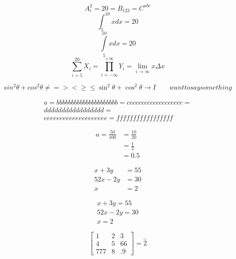 \documentclass[12pt, a4paper]{article}
\begin{document}
\begin{equation}
    A_i^2 = 20 = B_{123} = C^{abc}
\end{equation}
\newpage
\begin{equation}
    \int_{5}^{10} x dx = 20
\end{equation}
\begin{equation}
    \int\limits_{5}^{10} x dx = 20
\end{equation}
\begin{equation}
    \sum_{i=5}^{20}X_{i} = \prod_{i=-\infty}^{+\infty}Y_{i} = \lim_{i \to \infty} x \Delta x
\end{equation}

\begin{equation}
    sin^2 \theta + cos^2 \theta \neq = > < \geq \leq \sin^2 \theta + \cos^2 \theta \rightarrow I\qquad want to say something
\end{equation}

\begin{multline}
    a = bbbbbbbbbbbbbbbbbbbbb = ccccccccccccccccccc =\\ ddddddddddddddddd =\\ eeeeeeeeeeeeeeeeeeee = fffffffffffffffff
\end{multline}

\begin{equation}
    \begin{split}
        a = \frac{50}{100} &= \frac{10}{20}\\
        &= \frac{1}{2}\\
        &= 0.5
    \end{split}
\end{equation}

\begin{align}
    x + 3y &= 55\\
    52x - 2y &= 30\\
    x &= 2
\end{align}

\begin{gather}
    x + 3y = 55\\
    52x - 2y = 30\\
    x = 2
\end{gather}

\begin{equation}
    \begin{bmatrix}
        1 & 2 & 3\\
        4 & 5 & 66\\
        777 & 8 & .9
    \end{bmatrix} = \hat{2}
\end{equation}
\end{document}
